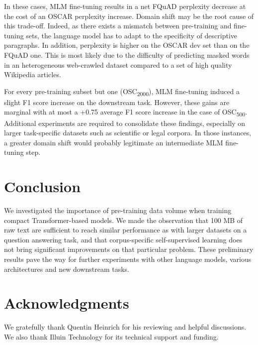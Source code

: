 \documentclass[11pt,a4paper]{article}
\begin{document}
In these cases, MLM fine-tuning results in a net FQuAD perplexity decrease at the cost of an OSCAR perplexity increase. Domain shift may be the root cause of this trade-off. Indeed, as there exists a mismatch between pre-training and fine-tuning sets, the language model has to adapt to the specificity of descriptive paragraphs. In addition, perplexity is higher on the OSCAR dev set than on the FQuAD one. This is most likely due to the difficulty of predicting masked words in an heterogeneous web-crawled dataset compared to a set of high quality Wikipedia articles. 

For every pre-training subset but one (OSC\textsubscript{2000}), MLM fine-tuning induced a slight F1 score increase on the downstream task. However, these gains are marginal with at most a +0.75 average F1 score increase in the case of OSC\textsubscript{500}. Additional experiments are required to consolidate these findings, especially on larger task-specific datasets such as scientific or legal corpora. In those instances, a greater domain shift would probably legitimate an intermediate MLM fine-tuning step.

\section{Conclusion}

We investigated the importance of pre-training data volume when training compact Transformer-based models. We made the observation that 100 MB
of raw text are sufficient to reach similar performance as with larger datasets on a question answering task, and that corpus-specific self-supervised learning does not bring significant improvements on that particular problem. These preliminary results pave the way for further experiments with other language models, various architectures and new downstream tasks.

\section*{Acknowledgments}

We gratefully thank Quentin Heinrich for his reviewing and helpful discussions. We also thank Illuin Technology for its technical support and funding.

\newpage



\end{document}
